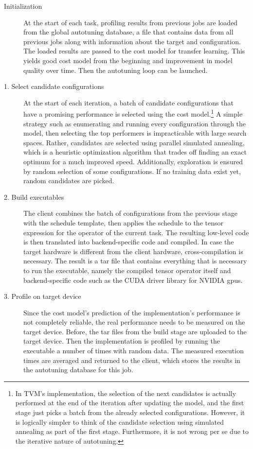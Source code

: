 \begin{description}
	\item[Initialization] At the start of each task, profiling results from previous jobs are loaded from the global autotuning database, a file that contains data from all previous jobs along with information about the target and configuration. The loaded results are passed to the cost model for transfer learning. This yields good cost model from the beginning and improvement in model quality over time. Then the autotuning loop can be launched.
	\item[1. Select candidate configurations] At the start of each iteration, a batch of candidate configurations that have a promising performance is selected using the cost model.\footnote{In TVM's implementation, the selection of the next candidates is actually performed at the end of the iteration after updating the model, and the first stage just picks a batch from the already selected configurations. However, it is logically simpler to think of the candidate selection using simulated annealing as part of the first stage. Furthermore, it is not wrong per se due to the iterative nature of autotuning.} A simple strategy such as enumerating and running every configuration through the model, then selecting the top performers is impracticable with large search spaces. Rather, candidates are selected using parallel simulated annealing, which is a heuristic optimization algorithm that trades off finding an exact optimum for a much improved speed. Additionally, exploration is ensured by random selection of some configurations. If no training data exist yet, random candidates are picked.
	\item[2. Build executables] The client combines the batch of configurations from the previous stage with the schedule template, then applies the schedule to the tensor expression for the operator of the current task. The resulting low-level code is then translated into backend-specific code and compiled. In case the target hardware is different from the client hardware, cross-compilation is necessary. The result is a tar file that contains everything that is necessary to run the executable, namely the compiled tensor operator itself and backend-specific code such as the CUDA driver library for NVIDIA \glspl{gpu}.
	\item[3. Profile on target device] Since the cost model's prediction of the implementation's performance is not completely reliable, the real performance needs to be measured on the target device. Before, the tar files from the build stage are uploaded to the target device. Then the implementation is profiled by running the executable a number of times with random data. The measured execution times are averaged and returned to the client, which stores the results in the autotuning database for this job.

\end{description}
